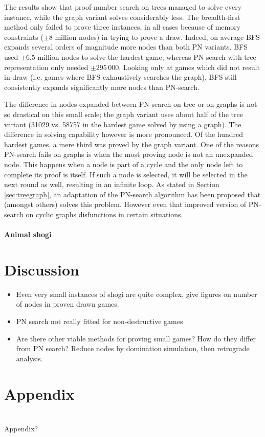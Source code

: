 \documentclass{article}
\begin{document}
The results show that proof-number search on trees managed to solve every instance, while the graph variant solves considerably less. The
breadth-first method only failed to prove three instances, in all cases because of memory constraints ($\pm8$ million nodes) in trying to prove a draw.
Indeed, on average BFS expands several orders of magnitude more nodes than both PN variants. BFS used $\pm6.5$ million nodes to solve the hardest
game, whereas PN-search with tree representation only needed $\pm295\,000$. Looking only at games which did not result in draw (i.e. games where
BFS exhaustively searches the graph), BFS still consistently expands significantly more nodes than PN-search.

The difference in nodes expanded between PN-search on tree or on graphs is not so drastical
on this small scale; the graph variant uses about half of the tree variant (31029 vs. 58757 in the hardest game solved by using a graph).
The difference in solving capability however is more pronounced. Of the hundred hardest games, a mere third was proved by the graph variant.
One of the reasons PN-search fails on graphs is when the most proving node is not an unexpanded node. This happens when a node is part of a cycle
and the only node left to complete its proof is itself. If such a node is selected, it will be selected in the next round as well, resulting
in an infinite loop. As stated in Section \ref{sec:treegraph}, an adaptation of the PN-search algorithm has been proposed that (amongst others)
solves this problem. However even that improved version of PN-search on cyclic graphs disfunctions in certain situations.

\paragraph{Animal shogi}


\section{Discussion}


\begin{itemize}
	\item Even very small instances of shogi are quite complex, give figures on number of nodes in proven drawn games.
	\item PN search not really fitted for non-destructive games
	\item Are there other viable methods for proving small games? How do they differ from PN search? Reduce nodes by domination simulation, then retrograde analysis.
\end{itemize}

\section{Appendix}
\appendix
\section{}
Appendix?

{}

\end{document}
